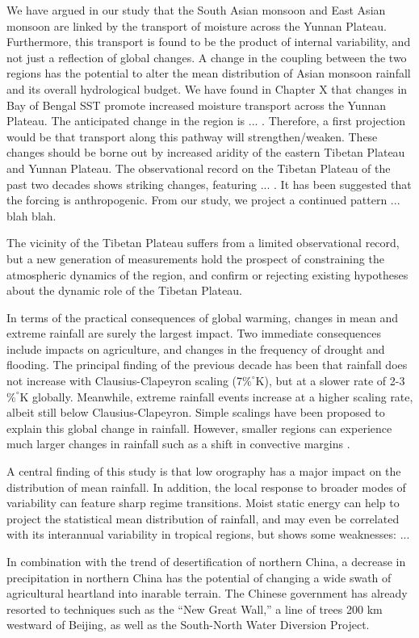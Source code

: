 	We have argued in our study that the South Asian monsoon and East Asian monsoon are linked by the transport of moisture across the Yunnan Plateau. Furthermore, this transport is found to be the product of internal variability, and not just a reflection of global changes. A change in the coupling between the two regions has the potential to alter the mean distribution of Asian monsoon rainfall and its overall hydrological budget. We have found in Chapter X that changes in Bay of Bengal SST promote increased moisture transport across the Yunnan Plateau. The anticipated change in the region is ... . Therefore, a first projection would be that transport along this pathway will strengthen/weaken. These changes should be borne out by increased aridity of the eastern Tibetan Plateau and Yunnan Plateau. The observational record on the Tibetan Plateau of the past two decades shows striking changes, featuring ... . It has been suggested that the forcing is anthropogenic. From our study, we project a continued pattern ... blah blah.
	
	The vicinity of the Tibetan Plateau suffers from a limited observational record, but a new generation of measurements hold the prospect of constraining the atmospheric dynamics of the region, and confirm or rejecting existing hypotheses about the dynamic role of the Tibetan Plateau.
 
	In terms of the practical consequences of global warming, changes in mean and extreme rainfall are surely the largest impact. Two immediate consequences include impacts on agriculture, and changes in the frequency of drought and flooding. The principal finding of the previous decade has been that rainfall does not increase with Clausius-Clapeyron scaling (7$\%^{\circ}$K), but at a slower rate of 2-3$\%^{\circ}$K globally. Meanwhile, extreme rainfall events increase at a higher scaling rate, albeit still below Clausius-Clapeyron. Simple scalings have been proposed to explain this global change in rainfall. However, smaller regions can experience much larger changes in rainfall such as a shift in convective margins \cite{Lintner2007}.

	A central finding of this study is that low orography has a major impact on the distribution of mean rainfall. In addition, the local response to broader modes of variability can feature sharp regime transitions. Moist static energy can help to project the statistical mean distribution of rainfall, and may even be correlated with its interannual variability in tropical regions, but shows some weaknesses: ...

	In combination with the trend of desertification of northern China, a decrease in precipitation in northern China has the potential of changing a wide swath of agricultural heartland into inarable terrain. The Chinese government has already resorted to techniques such as the ``New Great Wall,'' a line of trees 200 km westward of Beijing, as well as the South-North Water Diversion Project.